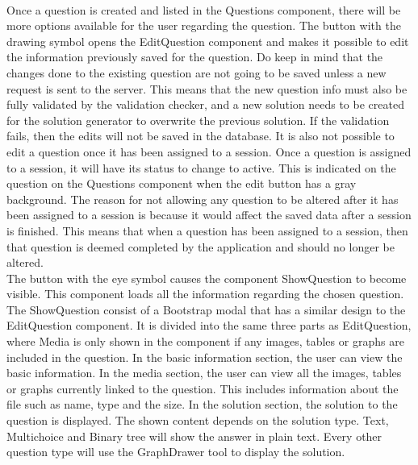 \\[11pt]
Once a question is created and listed in the Questions component, there will be more options available for the user regarding the question. The button with the drawing symbol opens the EditQuestion component and makes it possible to edit the information previously saved for the question. Do keep in mind that the changes done to the existing question are not going to be saved unless a new request is sent to the server. This means that the new question info must also be fully validated by the validation checker, and a new solution needs to be created for the solution generator to overwrite the previous solution. If the validation fails, then the edits will not be saved in the database. It is also not possible to edit a question once it has been assigned to a session. Once a question is assigned to a session, it will have its status to change to active. This is indicated on the question on the Questions component when the edit button has a gray background. The reason for not allowing any question to be altered after it has been assigned to a session is because it would affect the saved data after a session is finished. This means that when a question has been assigned to a session, then that question is deemed completed by the application and should no longer be altered.
\\[11pt]
The button with the eye symbol causes the component ShowQuestion to become visible. This component loads all the information regarding the chosen question. The ShowQuestion consist of a Bootstrap modal that has a similar design to the EditQuestion component. It is divided into the same three parts as EditQuestion, where Media is only shown in the component if any images, tables or graphs are included in the question. In the basic information section, the user can view the basic information. In the media section, the user can view all the images, tables or graphs currently linked to the question. This includes information about the file such as name, type and the size. In the solution section, the solution to the question is displayed. The shown content depends on the solution type. Text, Multichoice and Binary tree will show the answer in plain text. Every other question type will use the GraphDrawer tool to display the solution. 
